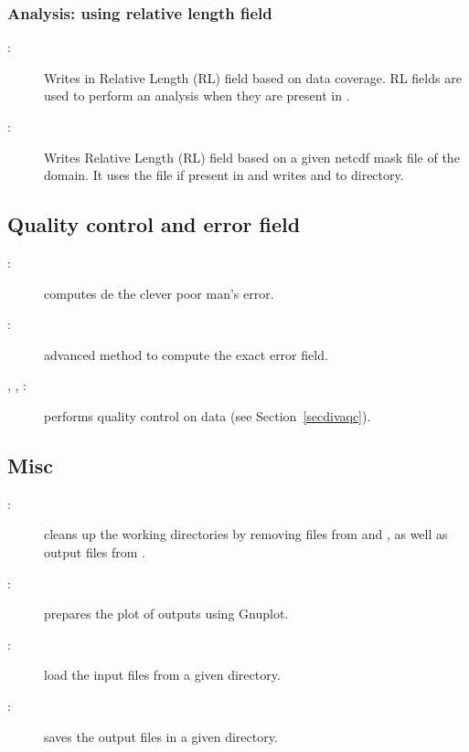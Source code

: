 \subsubsection{Analysis: using relative length field}

\begin{description}
\item[:] Writes in  Relative Length (RL) field based on data coverage. RL fields are used to perform an analysis when they are present in  .
\item[:] Writes Relative Length (RL) field based on a given netcdf mask file of the domain. It uses the file  if present in  and writes  and  to  directory.

\end{description}


\subsection{Quality control and error field}

\begin{description}
\item[:] computes de the clever poor man's error.
\item[:] advanced method to compute the exact error field.
\item[, , :] performs quality control on data (see Section~\ref{secdivaqc}).
\end{description}

\subsection{Misc}

\begin{description}
\item[:] cleans up the working directories by removing  files from  and , as well as output files from .
\item[:] prepares the plot of outputs using Gnuplot.
\item[:] load the input files from a given directory.
\item[:] saves the output files in a given directory.
\end{description}

